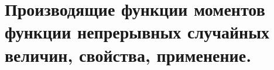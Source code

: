 \documentclass[polytech/stats/exam-2023/stats-exam-2023.tex]{subfiles}
\begin{document}
\section{Производящие функции моментов функции непрерывных случайных величин, свойства, применение.}
\end{document}
